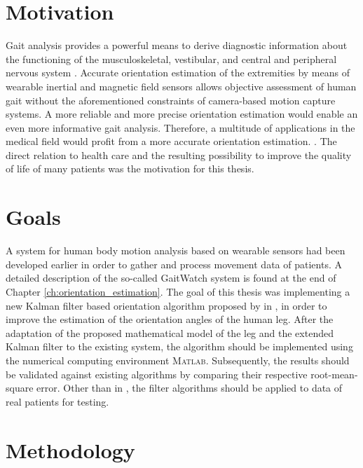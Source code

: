 \section{Motivation}

Gait analysis provides a powerful means to derive diagnostic information about the functioning of the musculoskeletal, vestibular, and central and peripheral nervous system \cite{bennett_extended_2013}. Accurate orientation estimation of the extremities by means of wearable inertial and magnetic field sensors allows objective assessment of human gait without the aforementioned constraints of camera-based motion capture systems. A more reliable and more precise orientation estimation would enable an even more informative gait analysis. Therefore, a multitude of applications in the medical field would profit from a more accurate orientation estimation. \cite{wong_clinical_2007}. The direct relation to health care and the resulting possibility to improve the quality of life of many patients was the motivation for this thesis.

\section{Goals}

A system for human body motion analysis based on wearable sensors had been developed earlier in order to gather and process  movement data of patients. A detailed description of the so-called GaitWatch system is found at the end of Chapter \ref{ch:orientation_estimation}. The goal of this thesis was implementing a new Kalman filter based orientation algorithm proposed by \citeauthor{bennett_motion_2014} in \cite{bennett_motion_2014}, in order to improve the estimation of the orientation angles of the human leg. After the adaptation of the proposed mathematical model of the leg and the extended Kalman filter to the existing system, the algorithm should be implemented using the numerical computing environment \textsc{Matlab}\textsuperscript{\textregistered}. Subsequently, the results should be validated against existing algorithms by comparing their respective root-mean-square error. Other than in \cite{bennett_motion_2014}, the filter algorithms should be applied to data of real patients for testing.

\section{Methodology}

